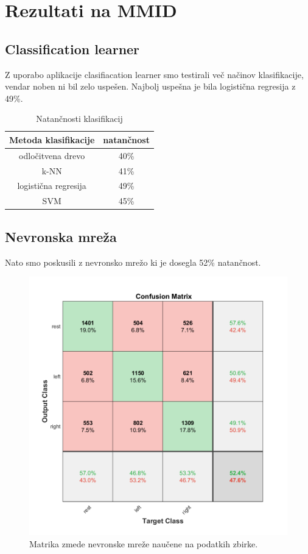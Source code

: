 \section{Rezultati na MMID}
\subsection{Classification learner}
Z uporabo aplikacije clasifiacation learner smo testirali več načinov klasifikacije, vendar noben ni bil zelo uspešen. Najbolj uspešna je bila logistična regresija z 49\%.
\begin{table}[h]
\centering
\begin{tabular}{|c|c|}
\hline
Metoda klasifikacije & natančnost \\
\hline
odločitvena drevo & 40\%  \\
\hline
k-NN & 41\% \\
\hline
logistična regresija & 49\% \\
\hline
SVM & 45\% \\
\hline
\end{tabular}
\caption{Natančnosti klasifikacij}
\end{table}

\subsection{Nevronska mreža}
Nato smo poskusili z nevronsko mrežo ki je dosegla 52\% natančnost.

\begin{figure}[h!]
\begin{center}
\includegraphics[width=0.5\linewidth]{slike/Confusion_13-20Hz_0s-4s.png}
\end{center}
\caption{Matrika zmede nevronske mreže naučene na podatkih zbirke.}
\end{figure}



